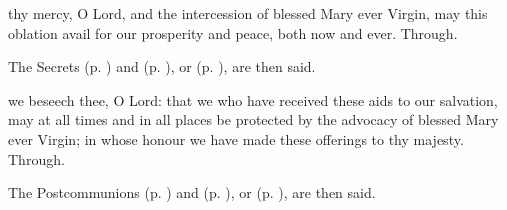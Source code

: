 
\secret
{} thy mercy, O Lord, and the intercession of blessed Mary ever Virgin, may this oblation avail for our prosperity and peace, both now and ever. Through.
\begin{rubric}
    The Secrets  (p. \pageref{SPHolyGhost}) and  (p. \pageref{SPAgainst}), or  (p. \pageref{SPChiefBishop}), are then said.
\end{rubric}


\postcommunion
{} we beseech thee, O Lord: that we who have received these aids to our salvation, may at all times and in all places be protected by the advocacy of blessed Mary ever Virgin; in whose honour we have made these offerings to thy majesty. Through.
\begin{rubric}
    The Postcommunions  (p. \pageref{SPHolyGhost}) and  (p. \pageref{SPAgainst}), or  (p. \pageref{SPChiefBishop}), are then said.
\end{rubric}


\clearpage
